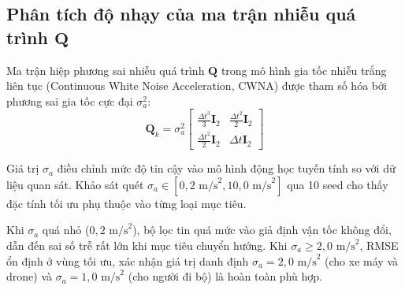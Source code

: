 \subsection{Phân tích độ nhạy của ma trận nhiễu quá trình \texorpdfstring{$\mathbf{Q}$}{Q}}

\hspace{0.5cm} Ma trận hiệp phương sai nhiễu quá trình $\mathbf{Q}$ trong mô hình gia tốc nhiễu trắng liên tục (Continuous White Noise Acceleration, CWNA) được tham số hóa bởi phương sai gia tốc cực đại $\sigma_a^2$:
\begin{equation}
\mathbf{Q}_k = \sigma_a^2 \begin{bmatrix} \frac{\Delta t^3}{3} \mathbf{I}_2 & \frac{\Delta t^2}{2} \mathbf{I}_2 \\ \frac{\Delta t^2}{2} \mathbf{I}_2 & \Delta t \mathbf{I}_2 \end{bmatrix}
\label{eq:q-matrix-math}
\end{equation}

Giá trị $\sigma_a$ điều chỉnh mức độ tin cậy vào mô hình động học tuyến tính so với dữ liệu quan sát. Khảo sát quét $\sigma_a \in [0{,}2\text{ m/s}^2, 10{,}0\text{ m/s}^2]$ qua 10 seed cho thấy đặc tính tối ưu phụ thuộc vào từng loại mục tiêu.

\begin{table}[H]
\centering
\caption{Độ nhạy RMSE của bộ lọc Kalman theo tham số gia tốc quá trình $\sigma_a$}
\label{tab:process-noise-sweep}
\end{table}

Khi $\sigma_a$ quá nhỏ ($0{,}2$ $\text{m/s}^2$), bộ lọc tin quá mức vào giả định vận tốc không đổi, dẫn đến sai số trễ rất lớn khi mục tiêu chuyển hướng. Khi $\sigma_a \ge 2{,}0$ $\text{m/s}^2$, RMSE ổn định ở vùng tối ưu, xác nhận giá trị danh định $\sigma_a = 2{,}0\text{ m/s}^2$ (cho xe máy và drone) và $\sigma_a = 1{,}0\text{ m/s}^2$ (cho người đi bộ) là hoàn toàn phù hợp.

